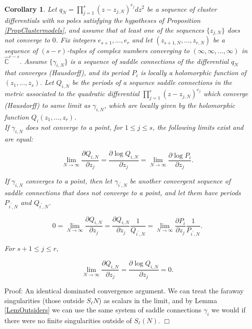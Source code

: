 \documentclass[12pt]{article}
\newtheorem{corollary}[theorem]{Corollary}
\newcommand{\cc}{\mathbb{C}}
\begin{document}
\begin{corollary}\label{CoroLogmodelsprep}Let $q_N = \prod\limits_{j = 1}^s (z-z_{j,N})^{e_j}dz^2$ be a sequence of cluster differentials with no poles satisfying the hypotheses of Proposition \ref{PropClustermodels}, and assume that at least one of the sequences $\{z_{j,N}\}$ does not converge to $0$. Fix integers $e_{s+1},...,e_r$ and let $(z_{s+1,N},...,z_{r,N})$ be a sequence of $(s-r)$-tuples of complex numbers converging to $(\infty,\infty,...,\infty)$ in $\hat{\cc}^{r-s}$. Assume $\{\gamma_{i,N}\}$ is a sequence of saddle connections of the differential $q_N$ that converges (Hausdorff), and its period $P_i$ is locally a holomorphic function of $(z_1,...,z_s)$. Let $Q_{i,N}$ be the periods of a sequence saddle connections in the metric associated to the quadratic differential $\prod_{j = 1}^r (z - z_{j,N})^{e_j}$ which converge (Hausdorff) to same limit as $\gamma_{i,N}$, which are locally given by the holomorphic function $Q_i(z_1,...,z_r)$.\\

\noindent If $\gamma_{i,N}$ does not converge to a point, for $1 \leq j \leq s$, the following limits exist and are equal:

$$\lim\limits_{N \to \infty} \frac{\partial Q_{i,N}}{\partial z_j} = \frac{\partial \log Q_{i,N}}{\partial z_j} = \lim\limits_{N \to \infty} \frac{\partial \log P_i}{\partial z_j}.$$

\noindent If $\gamma_{i,N}$ converges to a point, then let $\gamma_{i^\prime,N}$ be another convergent sequence of saddle connections that does not converge to a point, and let them have periods $P_{i^\prime,N}$ and $Q_{i^\prime,N}$.

$$0 = \lim\limits_{N \to \infty} \frac{\partial Q_{i,N}}{\partial z_j} = \frac{\partial Q_{i,N}}{\partial z_j}\frac{1}{Q_{i^\prime,N}} = \lim\limits_{N \to \infty} \frac{\partial P_i}{\partial z_j}\frac{1}{P_{i^\prime,N}}.$$

\noindent For $s + 1 \leq j \leq r$,

$$\lim\limits_{N \to \infty} \frac{\partial Q_{i,N}}{\partial z_j} = \frac{\partial \log Q_{i,N}}{\partial z_j} = 0.$$ \end{corollary}

\noindent Proof: An identical dominated convergence argument. We can treat the faraway singularities (those outside $S_\ell{N}$) as scalars in the limit, and by Lemma \ref{LemOutsiders} we can use the same system of saddle connections $\gamma_i$ we would if there were no finite singularities outside of $S_\ell(N)$. $\Box$
\end{document}
